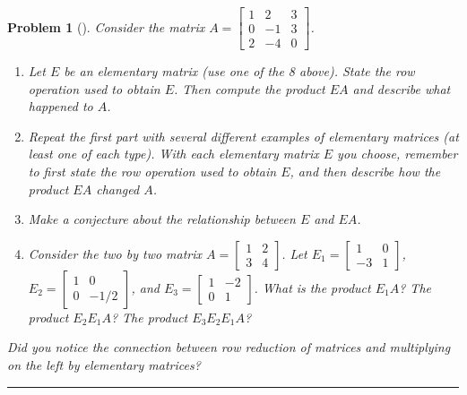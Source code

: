 \documentclass[letterpaper,oneside]{book}%
\theoremstyle{plain}
\theoremstyle{box}
\theoremstyle{problem}
\newtheorem{problemnum}{Problem}[chapter]
\newenvironment{problem}[1][]{\begin{problemnum}[#1]}{\end{problemnum}\nopagebreak\hrule\bigskip}
\newcommand{\bvec}[1]{\begin{bmatrix} #1 \end{bmatrix}}
\begin{document}
\begin{problem}
Consider the matrix
$A=\begin{bmatrix}
1&2&3\\
0&-1&3\\
2&-4&0
\end{bmatrix}$.

\begin{enumerate}
 \item Let $E$ be an elementary matrix (use one of the 8 above). State the row operation used to obtain $E$. 
 Then compute the product $EA$ and describe what happened to $A$.
 \item Repeat the first part with several different examples of elementary matrices (at least one of each type).  With each elementary matrix $E$ you choose, remember to first state the row operation used to obtain $E$, and then describe how the product $EA$ changed $A$.  
 \item Make a conjecture about the relationship between $E$ and $EA$.
 \item Consider the two by two matrix $A=\bvec{1&2\\3&4}$. Let $E_1=\bvec{1&0\\-3&1}$, $E_2=\bvec{1&0\\0&-1/2}$, and  $E_3=\bvec{1&-2\\0&1}$.  What is the product $E_1A$? The product $E_2E_1A$? The product $E_3E_2E_1A$? 
\end{enumerate}
Did you notice the connection between row reduction of matrices and multiplying on the left by elementary matrices?
\end{problem}
\end{document}
